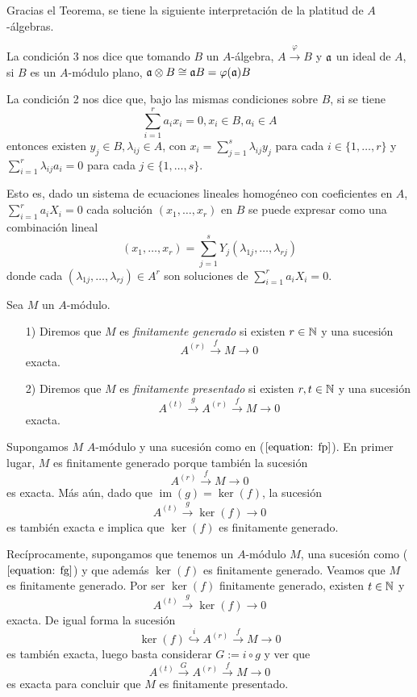 \documentclass[../main.tex]{subfiles}
\begin{document}
\begin{remark} Gracias el Teorema, se tiene la siguiente interpretación de la platitud de $A$-álgebras.
	
	La condición 3 nos dice que tomando $B$ un $A$-álgebra, $A\overset{\varphi}{\rightarrow}B$ y $\mathfrak{a}$ un ideal de $A$, si $B$ es un $A$-módulo plano, $\mathfrak{a}\otimes B\cong \mathfrak{a} B=\varphi(\mathfrak{a})B$
	
	La condición 2 nos dice que, bajo las mismas condiciones sobre $B$, si se tiene $$\sum_{i=1}^r a_ix_i=0, x_i\in B, a_i\in A$$ entonces existen $y_j\in B, \lambda_{ij}\in A$, con $x_i=\sum_{j=1}^s\lambda_{ij}y_j$ para cada $i\in\{1,\dots,r\}$ y $\sum_{i=1}^r\lambda_{ij}a_i=0$ para cada $j\in\{1,\dots,s\}$.
	
	Esto es, dado un sistema de ecuaciones lineales homogéneo con coeficientes en $A$, $\sum_{i=1}^ra_iX_i=0$ cada solución  $(x_1,\dots,x_r)$ en $B$ se puede expresar como una combinación lineal$$(x_1,\dots,x_r)=\sum_{j=1}^sY_j(\lambda_{1j},\dots,\lambda_{rj})$$ donde cada $(\lambda_{1j},\dots,\lambda_{rj})\in A^r$ son soluciones de $\sum_{i=1}^ra_iX_i=0$.
\end{remark}
\begin{definition}
	Sea $M$ un $A$-módulo.
	\begin{itemize}
		\item[1)] Diremos que $M$ es \textit{finitamente generado} si existen $r\in\mathbb{N}$ y una sucesión
		\begin{equation}\label{equation: fg}
		A^{(r)}\overset{f}{\longrightarrow}M\longrightarrow 0
		\end{equation}
		exacta.
		\item[2)] Diremos que $M$ es \textit{finitamente presentado} si existen $r,t\in\mathbb{N}$ y una sucesión
		\begin{equation}\label{equation: fp}
		A^{(t)}\overset{g}{\longrightarrow}A^{(r)}\overset{f}{\longrightarrow}M\longrightarrow 0
		\end{equation}
		exacta.
	\end{itemize}
\end{definition}
\begin{remark}
	Supongamos $M$ $A$-módulo y una sucesión como en ($\ref{equation: fp}$). En primer lugar, $M$ es finitamente generado porque también la sucesión
	$$A^{(r)}\overset{f}{\longrightarrow}M\longrightarrow 0$$
	es exacta. Más aún, dado que $\operatorname{im}(g)=\ker(f)$, la sucesión
	$$A^{(t)}\overset{g}{\longrightarrow}\ker(f)\longrightarrow 0$$
	es también exacta e implica que $\ker(f)$ es finitamente generado.
	
	Recíprocamente, supongamos que tenemos un $A$-módulo $M$, una sucesión como ($\ref{equation: fg}$) y que además $\ker(f)$ es finitamente generado. Veamos que $M$ es finitamente generado.
	Por ser $\ker(f)$ finitamente generado, existen $t\in\mathbb{N}$ y $$A^{(t)}\overset{g}{\longrightarrow}\ker(f)\longrightarrow 0$$ exacta. De igual forma la sucesión
	$$\ker(f)\overset{i}{\hookrightarrow} A^{(r)}\overset{f}{\longrightarrow}M\longrightarrow 0$$ es también exacta, luego basta considerar $G:=i\circ g$ y ver que
	$$A^{(t)}\overset{G}{\longrightarrow}A^{(r)}\overset{f}{\longrightarrow}M\longrightarrow0$$
	es exacta para concluir que $M$ es finitamente presentado.
\end{remark}
\end{document}
